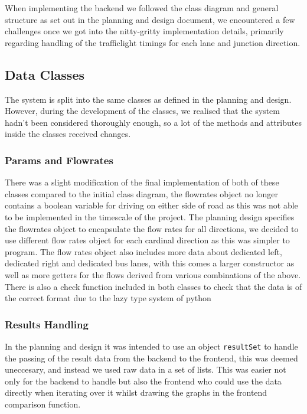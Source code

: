 \documentclass{article}
\begin{document}
    When implementing the backend we followed the class diagram and general structure as set out in the planning and
    design document, we encountered a few challenges once we got into the nitty-gritty implementation details, primarily
    regarding handling of the trafficlight timings for each lane and junction direction.

    \subsection{Data Classes}

    The system is split into the same classes as defined in the planning and design. However, during the development of the
    classes, we realised that the system hadn’t been considered thoroughly enough, so a lot of the methods and attributes
    inside the classes received changes.

    \subsubsection{Params and Flowrates}

    There was a slight modification of the final implementation of both of these classes compared to the initial class
    diagram, the flowrates object no longer contains a boolean variable for driving on either side of road as this was
    not able to be implemented in the timescale of the project. The planning design specifies the flowrates object to
    encapsulate the flow rates for all directions, we decided to use different flow rates object for each cardinal
    direction as this was simpler to program. The flow rates object also includes more data about dedicated left,
    dedicated right and dedicated bus lanes, with this comes a larger constructor as well as more getters for the
    flows derived from various combinations of the above. There is also a check function included in both classes to
    check that the data is of the correct format due to the lazy type system of python

    \subsubsection{Results Handling}

    In the planning and design it was intended to use an object \texttt{resultSet} to handle the passing of the result
    data from the backend to the frontend, this was deemed uneccesary, and instead we used raw data in a set of lists.
    This was easier not only for the backend to handle but also the frontend who could use the data directly when iterating
    over it whilst drawing the graphs in the frontend comparison function.
\end{document}
